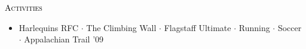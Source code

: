 \begin{minipage}{\firstWidth}
\large \textcolor{Black}{\textsc{Activities}}
\end{minipage}
\begin{minipage}{\secondWidth}
    \begin{itemize}
    \item{\small Harlequins RFC $\cdot$ The Climbing Wall $\cdot$ Flagstaff Ultimate $\cdot$ Running $\cdot$ Soccer 
    $\cdot$  Appalachian Trail '09} 
    \end{itemize}
\end{minipage}
